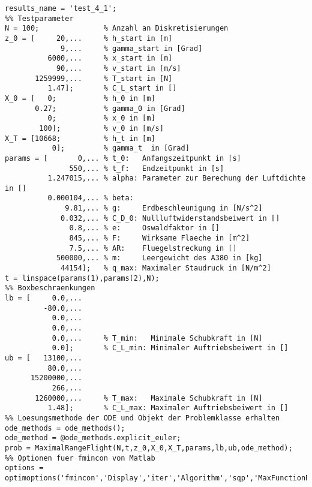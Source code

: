 \begin{lstlisting}[style=num_octave, caption={Matlab Programmcode von Versuchsskript \texttt{test\_4\_1.m}.}, label=code:direct_test_4_1]
%% Speicher Parameter
results_name = 'test_4_1';
%% Testparameter
N = 100;               % Anzahl an Diskretisierungen
z_0 = [     20,...     % h_start in [m]
             9,...     % gamma_start in [Grad]  
          6000,...     % x_start in [m]
            90,...     % v_start in [m/s]
       1259999,...     % T_start in [N]
          1.47];       % C_L_start in []
X_0 = [   0;           % h_0 in [m]
       0.27;           % gamma_0 in [Grad]
          0;           % x_0 in [m]
        100];          % v_0 in [m/s]
X_T = [10668;          % h_t in [m]
           0];         % gamma_t  in [Grad]
params = [       0,... % t_0:   Anfangszeitpunkt in [s]
               550,... % t_f:   Endzeitpunkt in [s]
          1.247015,... % alpha: Parameter zur Berechung der Luftdichte in []
          0.000104,... % beta: 
              9.81,... % g:     Erdbeschleunigung in [N/s^2]
             0.032,... % C_D_0: Nullluftwiderstandsbeiwert in []
               0.8,... % e:     Oswaldfaktor in []
               845,... % F:     Wirksame Flaeche in [m^2]
               7.5,... % AR:    Fluegelstreckung in []
            500000,... % m:     Leergewicht des A380 in [kg]
             44154];   % q_max: Maximaler Staudruck in [N/m^2]  
t = linspace(params(1),params(2),N);
%% Boxbeschraenkungen
lb = [     0.0,...
         -80.0,...
           0.0,...
           0.0,...
           0.0,...     % T_min:   Minimale Schubkraft in [N]
           0.0];       % C_L_min: Minimaler Auftriebsbeiwert in []
ub = [   13100,...
          80.0,...
      15200000,...
           266,...
       1260000,...     % T_max:   Maximale Schubkraft in [N]
          1.48];       % C_L_max: Maximaler Auftriebsbeiwert in []
%% Loesungsmethode der ODE und Objekt der Problemklasse erhalten
ode_methods = ode_methods();
ode_method = @ode_methods.explicit_euler;
prob = MaximalRangeFlight(N,t,z_0,X_0,X_T,params,lb,ub,ode_method);
%% Optionen fuer fmincon von Matlab
options = optimoptions('fmincon','Display','iter','Algorithm','sqp','MaxFunctionEvaluations',2000.0e+03,'MaxIterations',4.0e+05,'UseParallel',true);
\end{lstlisting}







